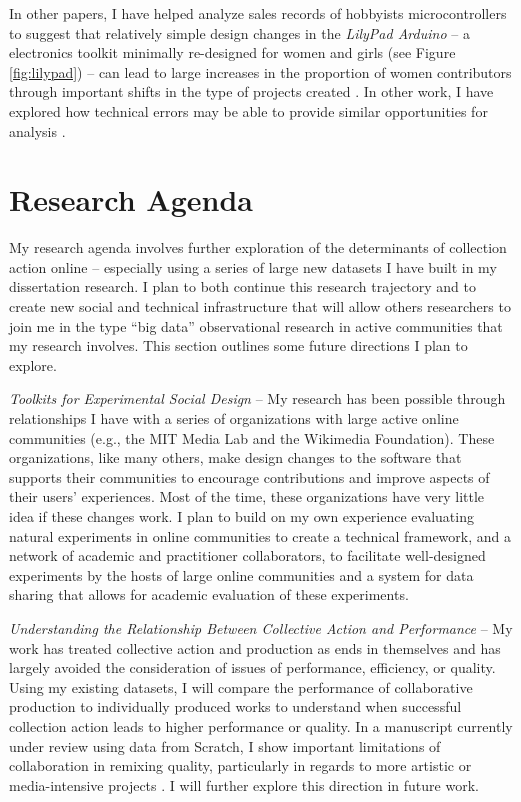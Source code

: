 \documentclass[10pt]{memoir}
\begin{document}
In other papers, I have helped analyze sales records of hobbyists
microcontrollers to suggest that relatively simple design changes in
the \emph{LilyPad Arduino} -- a electronics toolkit minimally
re-designed for women and girls (see Figure \ref{fig:lilypad}) -- can
lead to large increases in the proportion of women contributors
through important shifts in the type of projects created
\cite{buechley_lilypad_2010}. In other work, I have explored how
technical errors may be able to provide similar opportunities for
analysis \cite{hill_revealing_2010}.


\section{Research Agenda}

My research agenda involves further exploration of the determinants of
collection action online -- especially using a series of large new
datasets I have built in my dissertation research. I plan to both
continue this research trajectory and to create new social and
technical infrastructure that will allow others researchers to join me
in the type ``big data'' observational research in active communities
that my research involves. This section outlines some future
directions I plan to explore.

\emph{Toolkits for Experimental Social Design} -- My research has been
possible through relationships I have with a series of organizations
with large active online communities (e.g., the MIT Media Lab and the
Wikimedia Foundation). These organizations, like many others, make
design changes to the software that supports their communities to
encourage contributions and improve aspects of their users'
experiences. Most of the time, these organizations have very little
idea if these changes work. I plan to build on my own experience
evaluating natural experiments in online communities to create a
technical framework, and a network of academic and practitioner
collaborators, to facilitate well-designed experiments by the hosts of
large online communities and a system for data sharing that allows for
academic evaluation of these experiments.

\emph{Understanding the Relationship Between Collective Action and
  Performance} -- My work has treated collective action and production
as ends in themselves and has largely avoided the consideration of
issues of performance, efficiency, or quality. Using my existing
datasets, I will compare the performance of collaborative production
to individually produced works to understand when successful
collection action leads to higher performance or quality. In a
manuscript currently under review using data from Scratch, I show
important limitations of collaboration in remixing quality,
particularly in regards to more artistic or media-intensive projects
\cite{hill_cost_2012}. I will further explore this direction in future
work.
\end{document}
